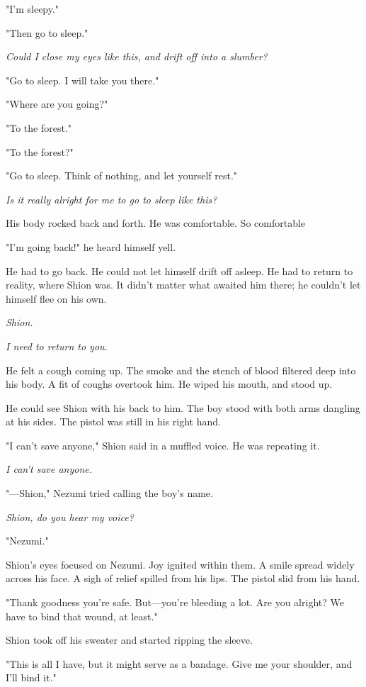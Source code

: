 "\el I'm sleepy."

"Then go to sleep."

\emph{Could I close my eyes like this, and drift off into a slumber?}

"Go to sleep. I will take you there."

"\el Where are you going?"

"To the forest."

"To the forest?"

"Go to sleep. Think of nothing, and let yourself rest."

\emph{Is it really alright for me to go to sleep like this?}

His body rocked back and forth. He was comfortable. So comfortable\el 

"I'm going back!" he heard himself yell.

He had to go back. He could not let himself drift off asleep. He had to
return to reality, where Shion was. It didn't matter what awaited him
there; he couldn't let himself flee on his own.

\emph{Shion.}

\emph{I need to return to you.}

\myspace

He felt a cough coming up. The smoke and the stench of blood filtered
deep into his body. A fit of coughs overtook him. He wiped his mouth,
and stood up.

He could see Shion with his back to him. The boy stood with both arms
dangling at his sides. The pistol was still in his right hand.

"I can't save anyone," Shion said in a muffled voice. He was repeating
it.

\emph{I can't save anyone.}

"---Shion," Nezumi tried calling the boy's name.

\emph{Shion, do you hear my voice?}

"Nezumi."

Shion's eyes focused on Nezumi. Joy ignited within them. A smile spread
widely across his face. A sigh of relief spilled from his lips. The
pistol slid from his hand.

"Thank goodness you're safe. But---you're bleeding a lot. Are you alright?
We have to bind that wound, at least."

Shion took off his sweater and started ripping the sleeve.

"This is all I have, but it might serve as a bandage. Give me your
shoulder, and I'll bind it."

